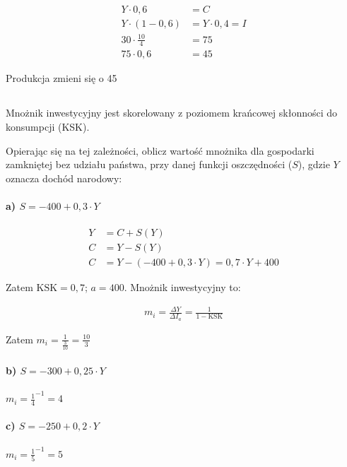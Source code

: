\documentclass[a4paper,12pt]{article}
\begin{document}
\begin{align*}
	Y \cdot 0,6                  & = C               \\
	Y \cdot \left(1 - 0,6\right) & = Y \cdot 0,4 = I \\
	30 \cdot \frac{10}{4}        & = 75              \\
	75 \cdot 0,6                 & = 45
\end{align*}

Produkcja zmieni się o 45


\subsection{}
Mnożnik inwestycyjny jest skorelowany z poziomem krańcowej skłonności do konsumpcji (KSK).

Opierając się na tej zależności, oblicz wartość mnożnika dla gospodarki zamkniętej bez udziału państwa, przy danej funkcji oszczędności ($S$), gdzie $Y$ oznacza dochód narodowy:

\paragraph*{a) $S = -400 + 0,3\cdot Y$}
\begin{align*}
	Y & = C + S\left(Y\right)                                       \\
	C & = Y - S\left(Y\right)                                       \\
	C & = Y - \left( - 400 + 0,3 \cdot Y\right) = 0,7 \cdot Y + 400
\end{align*}

Zatem $\text{KSK} = 0,7$; $a = 400$. Mnożnik inwestycyjny to:

\begin{align*}
	m_i = \frac{\Delta Y}{\Delta I_a} = \frac{1}{1 - \text{KSK}}
\end{align*}

Zatem $m_i = \frac{1}{\frac{3}{10}} = \frac{10}{3}$
\paragraph*{b) $S = -300 + 0,25\cdot Y$}
$m_i = \frac{1}{4}^{-1} = 4$

\paragraph*{c) $S = -250 + 0,2\cdot Y$}

$m_i = \frac{1}{5}^{-1} = 5$
\end{document}

